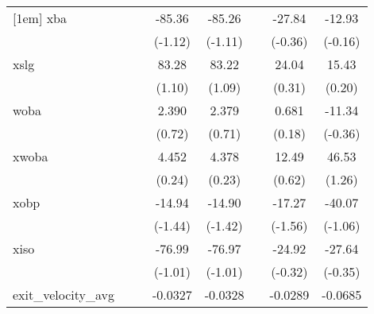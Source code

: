{\begin{tabular}{l*{7}{c}}
[1em]
xba         &                     &                     &      -85.36         &      -85.26         &                     &      -27.84         &      -12.93         \\
            &                     &                     &     (-1.12)         &     (-1.11)         &                     &     (-0.36)         &     (-0.16)         \\
[1em]
xslg        &                     &                     &       83.28         &       83.22         &                     &       24.04         &       15.43         \\
            &                     &                     &      (1.10)         &      (1.09)         &                     &      (0.31)         &      (0.20)         \\
[1em]
woba        &                     &                     &       2.390         &       2.379         &                     &       0.681         &      -11.34         \\
            &                     &                     &      (0.72)         &      (0.71)         &                     &      (0.18)         &     (-0.36)         \\
[1em]
xwoba       &                     &                     &       4.452         &       4.378         &                     &       12.49         &       46.53         \\
            &                     &                     &      (0.24)         &      (0.23)         &                     &      (0.62)         &      (1.26)         \\
[1em]
xobp        &                     &                     &      -14.94         &      -14.90         &                     &      -17.27         &      -40.07         \\
            &                     &                     &     (-1.44)         &     (-1.42)         &                     &     (-1.56)         &     (-1.06)         \\
[1em]
xiso        &                     &                     &      -76.99         &      -76.97         &                     &      -24.92         &      -27.64         \\
            &                     &                     &     (-1.01)         &     (-1.01)         &                     &     (-0.32)         &     (-0.35)         \\
[1em]
exit\_velocity\_avg&                     &                     &     -0.0327         &     -0.0328         &                     &     -0.0289         &     -0.0685         \\

\end{tabular}}
